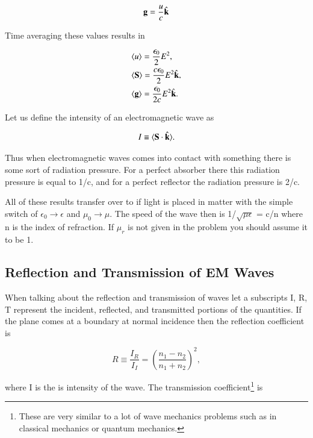 \documentclass[preprint, review,12pt]{elsarticle}
\def\.{\cdot}
\def\b{\textbf}
\def\={\equiv}
\newcommand{\hb}[1]{\hat{\b #1}}
\newcommand{\brak}[1]{\langle #1 \rangle}
\begin{document}
\begin{equation}
    \b g = \frac{u}{c} \hb{k}
\end{equation}

Time averaging these values results in

\begin{equation}
\begin{split}
    & \brak{u} = \frac{\epsilon_0}{2}E^2, \\
    & \brak{\b S} = \frac{c\epsilon_0}{2}E^2 \hb{k}, \\
    & \brak{\b g} = \frac{\epsilon_0}{2c}E^2 \hb{k}.
\end{split}
\end{equation}

Let us define the intensity of an electromagnetic wave as 

\begin{equation}
    I \= \brak{\b S \. \hb{k}}.
\end{equation}

Thus when electromagnetic waves comes into contact with something there is some sort of radiation pressure. For a perfect absorber there this radiation pressure is equal to 1/c, and for a perfect reflector the radiation pressure is 2/c.

All of these results transfer over to if light is placed in matter with the simple switch of $\epsilon_0 \rightarrow \epsilon$ and $\mu_0 \rightarrow \mu.$ The speed of the wave then is 1/$\sqrt{\mu \epsilon}$ = c/n where n is the index of refraction. If $\mu_r$ is not given in the problem you should assume it to be 1.

\subsection{Reflection and Transmission of EM Waves}

When talking about the reflection and transmission of waves let a subscripts I, R, T represent the incident, reflected, and transmitted portions of the quantities. If the plane comes at a boundary at normal incidence then the reflection coefficient is 

\begin{equation}
    R \= \frac{I_R}{I_I} = (\frac{n_1 - n_2}{n_1+ n_2})^2,
\end{equation}

where I is the is intensity of the wave. The transmission coefficient\footnote{These are very similar to a lot of wave mechanics problems such as in classical mechanics or quantum mechanics.} is
\end{document}

